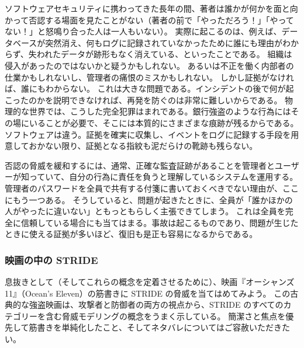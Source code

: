 \documentclass[uplatex]{jsarticle}
\def\label#1{}%
\begin{document}
\begin{exa}[否認の実際]\label{exa:ch2-repudiation-in-practice}
ソフトウェアセキュリティに携わってきた長年の間、著者は誰かが何かを面と向かって否認する場面を見たことがない（著者の前で「やっただろう！」「やってない！」と怒鳴り合った人は一人もいない）。
実際に起こるのは、例えば、データベースが突然消え、何もログに記録されていなかったために誰にも理由がわからず、失われたデータが跡形もなく消えている、といったことである。
組織は侵入があったのではないかと疑うかもしれない。
あるいは不正を働く内部者の仕業かもしれないし、管理者の痛恨のミスかもしれない。
しかし証拠がなければ、誰にもわからない。
これは大きな問題である。インシデントの後で何が起こったのかを説明できなければ、再発を防ぐのは非常に難しいからである。
物理的な世界では、こうした完全犯罪はまれである。銀行強盗のような行為にはその場にいることが必要で、そこには本質的にさまざまな痕跡が残るからである。
ソフトウェアは違う。証拠を確実に収集し、イベントをログに記録する手段を用意しておかない限り、証拠となる指紋も泥だらけの靴跡も残らない。
\end{exa}

否認の脅威を緩和するには、通常、正確な監査証跡があることを管理者とユーザーが知っていて、自分の行為に責任を負うと理解しているシステムを運用する。
管理者のパスワードを全員で共有する付箋に書いておくべきでない理由が、ここにもう一つある。
そうしていると、問題が起きたときに、全員が「誰かほかの人がやったに違いない」ともっともらしく主張できてしまう。
これは全員を完全に信頼している場合にも当てはまる。事故は起こるものであり、問題が生じたときに使える証拠が多いほど、復旧も是正も容易になるからである。

\subsubsection{映画の中の STRIDE}\label{subsec:ch2-stride-movies}

息抜きとして（そしてこれらの概念を定着させるために）、映画『オーシャンズ11』（Ocean's Eleven）の筋書きに STRIDE の脅威を当てはめてみよう。
この古典的な強盗映画は、攻撃者と防御者の両方の視点から、STRIDE のすべてのカテゴリーを含む脅威モデリングの概念をうまく示している。
簡潔さと焦点を優先して筋書きを単純化したこと、そしてネタバレについてはご容赦いただきたい。
\end{document}
